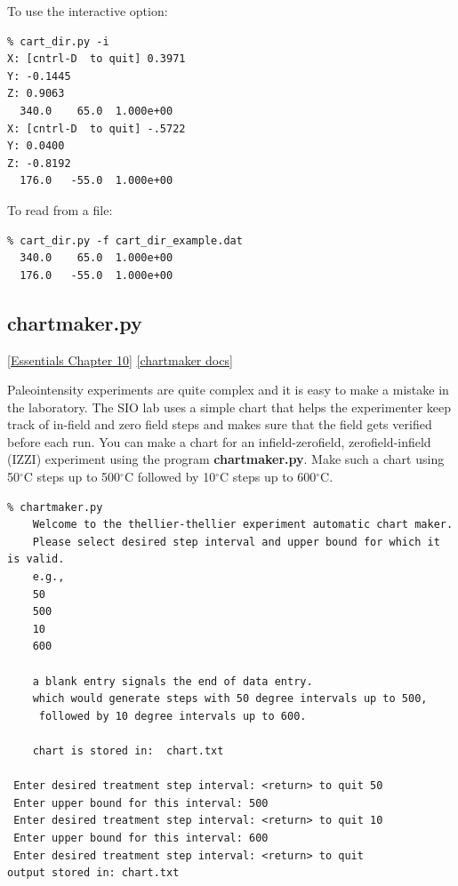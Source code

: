\documentclass[11pt]{book}
\begin{document}
{{{To use the interactive option:

\begin{verbatim}
% cart_dir.py -i
X: [cntrl-D  to quit] 0.3971
Y: -0.1445
Z: 0.9063
  340.0    65.0  1.000e+00
X: [cntrl-D  to quit] -.5722
Y: 0.0400
Z: -0.8192
  176.0   -55.0  1.000e+00
\end{verbatim}

To read from a file:

\begin{verbatim}
% cart_dir.py -f cart_dir_example.dat
  340.0    65.0  1.000e+00
  176.0   -55.0  1.000e+00
\end{verbatim} 

\subsection{chartmaker.py}
\label{ex:chartmaker}
\href{http://magician.ucsd.edu/Essentials_2/WebBook2ch10.html#ch10}{[Essentials Chapter 10]}
\href{http://earthref.org/PmagPy/pmagpydocs/chartmaker-module.html}{[chartmaker docs]}

Paleointensity experiments are quite complex and it is easy to make a mistake in the laboratory.  The SIO lab uses a simple chart that helps the experimenter keep track of in-field and zero field steps and makes sure that the field gets verified before each run.   You can make a chart for an infield-zerofield, zerofield-infield (IZZI) experiment using the program {\bf chartmaker.py}.   Make such a chart using 50$^{\circ}$C steps up to 500$^{\circ}$C  followed by 10$^{\circ}$C steps up to 600$^{\circ}$C.

\begin{verbatim}
% chartmaker.py
    Welcome to the thellier-thellier experiment automatic chart maker.   
    Please select desired step interval and upper bound for which it is valid.
    e.g.,   
    50 
    500
    10 
    600
    
    a blank entry signals the end of data entry.
    which would generate steps with 50 degree intervals up to 500,
     followed by 10 degree intervals up to 600.   
    
    chart is stored in:  chart.txt
    
 Enter desired treatment step interval: <return> to quit 50
 Enter upper bound for this interval: 500
 Enter desired treatment step interval: <return> to quit 10
 Enter upper bound for this interval: 600
 Enter desired treatment step interval: <return> to quit 
output stored in: chart.txt


\end{verbatim}}}}
\end{document}
